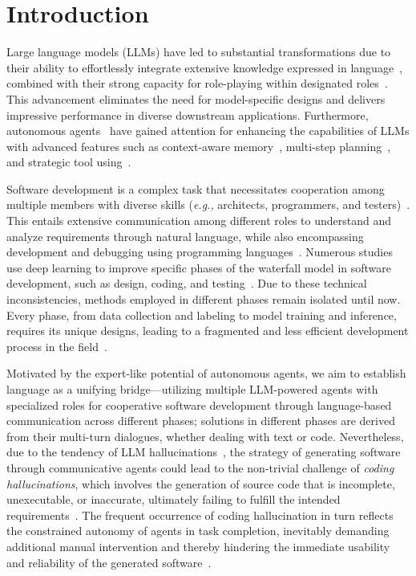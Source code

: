 \documentclass[11pt]{article}
\newcommand{\eg}{\textit{e.g., }}
\begin{document}
\section{Introduction}
Large language models (LLMs) have led to substantial transformations due to their ability to effortlessly integrate extensive knowledge expressed in language~\cite{NEURIPS2020_1457c0d6,bubeck2023sparks}, combined with their strong capacity for role-playing within designated roles~\cite{park2023generative,hua2023war,chen2023agentverse}.
This advancement eliminates the need for model-specific designs and delivers impressive performance in diverse downstream applications.
Furthermore, autonomous agents~\cite{AutoGPT,zhou2023webarena} have gained attention for enhancing the capabilities of LLMs with advanced features such as context-aware memory~\cite{sumers2023cognitive}, multi-step planning~\cite{liu2023bolaa}, and strategic tool using~\cite{schick2023toolformer}.

Software development is a complex task that necessitates cooperation among multiple members with diverse skills (\eg architects, programmers, and testers)~\cite{basili1989software,sawyer1998software}. 
This entails extensive communication among different roles to understand and analyze requirements through natural language, while also encompassing development and debugging using programming languages~\cite{ernst:LIPIcs.SNAPL.2017.4,banker1998software}.
Numerous studies use deep learning to improve specific phases of the waterfall model in software development, such as design, coding, and testing~\cite{DBLP:conf/re/PudlitzBV19,DBLP:journals/jss/MartinA15,DBLP:conf/wcre/GaoCXMSL19,DBLP:conf/icse/WangLT16}.
Due to these technical inconsistencies, methods employed in different phases remain isolated until now.
Every phase, from data collection and labeling to model training and inference, requires its unique designs, leading to a fragmented and less efficient development process in the field~\cite{DBLP:conf/icse/FreemanBSSDT01,ernst:LIPIcs.SNAPL.2017.4,DBLP:conf/se/WinklerGV20}.

Motivated by the expert-like potential of autonomous agents, we aim to establish language as a unifying bridge—utilizing multiple LLM-powered agents with specialized roles for cooperative software development through language-based communication across different phases; solutions in different phases are derived from their multi-turn dialogues, whether dealing with text or code.
Nevertheless, due to the tendency of LLM hallucinations~\cite{dhuliawala2023chain,zhang2023siren}, the strategy of generating software through communicative agents could lead to the non-trivial challenge of \textit{coding hallucinations}, which involves the generation of source code that is incomplete, unexecutable, or inaccurate, ultimately failing to fulfill the intended requirements~\cite{agnihotri2020systematic}.
The frequent occurrence of coding hallucination in turn reflects the constrained autonomy of agents in task completion, inevitably demanding additional manual intervention and thereby hindering the immediate usability and reliability of the generated software~\cite{ji2023survey}.
\end{document}
